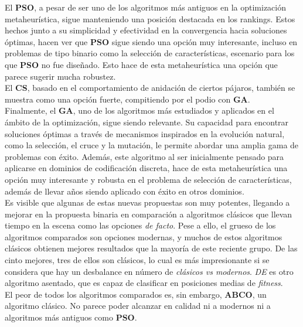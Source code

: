 El \textbf{PSO}, a pesar de ser uno de los algoritmos más antiguos en la optimización metaheurística, sigue manteniendo una posición destacada en los rankings. Estos hechos junto a su simplicidad y efectividad en la convergencia hacia soluciones óptimas, hacen ver que \textbf{PSO} sigue siendo una opción muy interesante, incluso en problemas de tipo binario como la selección de características, escenario para los que \textbf{PSO} no fue diseñado. Esto hace de esta metaheurística una opción que parece sugerir mucha robustez.\\[6pt]

El \textbf{CS}, basado en el comportamiento de anidación de ciertos pájaros, también se muestra como una opción fuerte, compitiendo por el podio con \textbf{GA}.\\[6pt]

Finalmente, el \textbf{GA}, uno de los algoritmos más estudiados y aplicados en el ámbito de la optimización, sigue siendo relevante. Su capacidad para encontrar soluciones óptimas a través de mecanismos inspirados en la evolución natural, como la selección, el cruce y la mutación, le permite abordar una amplia gama de problemas con éxito. Además, este algoritmo al ser inicialmente pensado para aplicarse en dominios de codificación discreta, hace de esta metaheurística una opción muy interesante y robusta en el problema de selección de características, además de llevar años siendo aplicado con éxito en otros dominios.\\[6pt]

Es visible que algunas de estas nuevas propuestas son muy potentes, llegando a mejorar en la propuesta binaria en comparación a algoritmos clásicos que llevan tiempo en la escena como las opciones \textit{de facto}. Pese a ello, el grueso de los algoritmos comparados son opciones modernas, y muchos de estos algoritmos clásicos obtienen mejores resultados que la mayoría de este reciente grupo. De las cinto mejores, tres de ellos son clásicos, lo cual es más impresionante si se considera que hay un desbalance en número de \textit{clásicos vs modernos}. \textit{DE} es otro algoritmo asentado, que es capaz de clasificar en posiciones medias de \textit{fitness}.\\[6pt]

El peor de todos los algoritmos comparados es, sin embargo, \textbf{ABCO}, un algoritmo clásico. No parece poder alcanzar en calidad ni a modernos ni a algoritmos más antiguos como \textbf{PSO}.

